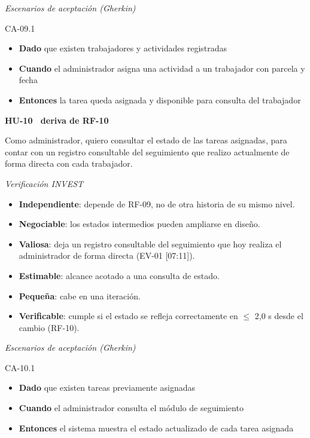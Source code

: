 \documentclass[12pt,a4paper]{article}
\begin{document}
\smallskip
\noindent\textit{Escenarios de aceptación (Gherkin)}

\noindent CA-09.1
\begin{itemize}
\item[] \textbf{Dado} que existen trabajadores y actividades registradas
\item[] \textbf{Cuando} el administrador asigna una actividad a un trabajador con parcela y fecha
\item[] \textbf{Entonces} la tarea queda asignada y disponible para consulta del trabajador
\end{itemize}

\bigskip
\noindent\textbf{HU-10 \textperiodcentered\ deriva de RF-10}

\smallskip
\noindent Como administrador, quiero consultar el estado de las tareas asignadas, para contar con un registro consultable del seguimiento que realizo actualmente de forma directa con cada trabajador.

\smallskip
\noindent\textit{Verificación INVEST}
\begin{itemize}
\item \textbf{Independiente}: depende de RF-09, no de otra historia de su mismo nivel.
\item \textbf{Negociable}: los estados intermedios pueden ampliarse en diseño.
\item \textbf{Valiosa}: deja un registro consultable del seguimiento que hoy realiza el administrador de forma directa (EV-01 [07:11]).
\item \textbf{Estimable}: alcance acotado a una consulta de estado.
\item \textbf{Pequeña}: cabe en una iteración.
\item \textbf{Verificable}: cumple si el estado se refleja correctamente en $\leq$ 2,0 s desde el cambio (RF-10).
\end{itemize}

\smallskip
\noindent\textit{Escenarios de aceptación (Gherkin)}

\noindent CA-10.1
\begin{itemize}
\item[] \textbf{Dado} que existen tareas previamente asignadas
\item[] \textbf{Cuando} el administrador consulta el módulo de seguimiento
\item[] \textbf{Entonces} el sistema muestra el estado actualizado de cada tarea asignada
\end{itemize}
\end{document}
